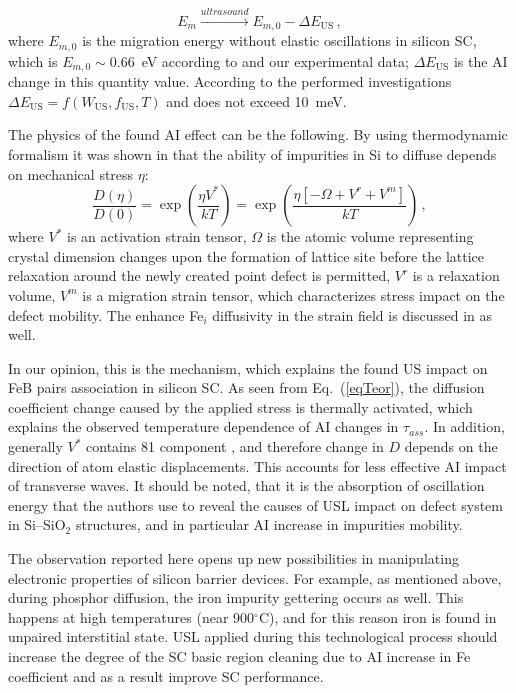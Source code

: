 \documentclass[sn-mathphys]{sn-jnl}%
\theoremstyle{thmstyleone}%
\theoremstyle{thmstyletwo}%
\theoremstyle{thmstylethree}%
\begin{document}
\begin{equation}
\label{eqEmUs}
E_m \xrightarrow{ultrasound} E_{m,0}-\Delta E_\mathrm{US}\,,
\end{equation}
where $E_{m,0}$ is the migration energy without elastic oscillations in silicon SC,
which is $E_{m,0}\sim0.66$~eV according to \cite{FeBAssJAP2014,FeBkinAPL2008} and our experimental data;
$\Delta E_\mathrm{US}$ is the AI change in this quantity value.
According to the performed investigations  $\Delta E_\mathrm{US}=f(W_\mathrm{US},f_\mathrm{US},T)$ and does not exceed 10~meV.

The physics of the found AI effect can be the following.
By using thermodynamic formalism it was shown in \cite{AZIZ2001} that the ability of
impurities in Si to diffuse depends on mechanical stress $\eta$:
\begin{equation}
\label{eqTeor}
\frac{D(\eta)}{D(0)}=\exp\left(\frac{\eta V^*}{kT}\right)=
\exp\left(\frac{\eta [-\Omega+V^r+V^m]}{kT}\right)\,,
\end{equation}
where
$V^*$ is an activation strain tensor,
$\Omega$ is the atomic volume representing  crystal dimension changes
upon the formation of lattice site before the lattice relaxation
around the newly created point defect is permitted,
$V^r$ is a relaxation volume,
$V^m$ is a migration strain tensor, which characterizes stress impact on the defect mobility.
The enhance Fe$_i$ diffusivity in the strain field is discussed in \cite{FeStrain} as well.

In our opinion, this is the mechanism, which explains the found US impact on FeB pairs association in silicon SC.
As seen from Eq.~(\ref{eqTeor}), the diffusion coefficient change caused
by the applied stress is thermally  activated, which explains the observed
temperature dependence of AI changes in $\tau_{ass}$.
In addition, generally $V^*$ contains 81 component  \cite{AZIZ2001},
and therefore change in $D$ depends on the direction of atom elastic displacements.
This accounts for less effective AI impact of transverse waves.
It should be noted, that it is the absorption of oscillation energy that the authors \cite{GORB2020,UST:Medvid}
use to reveal the causes of USL impact on defect system in Si--SiO$_2$ structures,
and in particular AI increase in impurities mobility.

The observation reported here opens up new possibilities in manipulating electronic
properties of silicon barrier devices.
For example, as mentioned above, during phosphor diffusion, the iron impurity gettering occurs as well.
This happens at high temperatures (near 900$^\circ$C),
and for this reason iron is found in unpaired interstitial state.
USL applied during this technological process should increase the degree of the SC basic region
cleaning due to AI increase in Fe coefficient and as a result improve SC performance.
\end{document}
